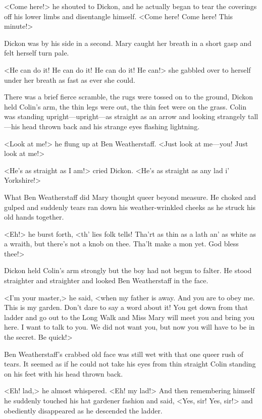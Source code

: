 <Come here!> he shouted to Dickon, and he actually began to tear the coverings off his lower limbs and disentangle himself. <Come here! Come here! This minute!>

Dickon was by his side in a second. Mary caught her breath in a short gasp and felt herself turn pale.

<He can do it! He can do it! He can do it! He can!> she gabbled over to herself under her breath as fast as ever she could.

There was a brief fierce scramble, the rugs were tossed on to the ground, Dickon held Colin's arm, the thin legs were out, the thin feet were on the grass. Colin was standing upright—upright—as straight as an arrow and looking strangely tall—his head thrown back and his strange eyes flashing lightning.

<Look at me!> he flung up at Ben Weatherstaff. <Just look at me—you! Just look at me!>

<He's as straight as I am!> cried Dickon. <He's as straight as any lad i' Yorkshire!>

What Ben Weatherstaff did Mary thought queer beyond measure. He choked and gulped and suddenly tears ran down his weather-wrinkled cheeks as he struck his old hands together.

<Eh!> he burst forth, <th' lies folk tells! Tha'rt as thin as a lath an' as white as a wraith, but there's not a knob on thee. Tha'lt make a mon yet. God bless thee!>

Dickon held Colin's arm strongly but the boy had not begun to falter. He stood straighter and straighter and looked Ben Weatherstaff in the face.

<I'm your master,> he said, <when my father is away. And you are to obey me. This is my garden. Don't dare to say a word about it! You get down from that ladder and go out to the Long Walk and Miss Mary will meet you and bring you here. I want to talk to you. We did not want you, but now you will have to be in the secret. Be quick!>

Ben Weatherstaff's crabbed old face was still wet with that one queer rush of tears. It seemed as if he could not take his eyes from thin straight Colin standing on his feet with his head thrown back.

<Eh! lad,> he almost whispered. <Eh! my lad!> And then remembering himself he suddenly touched his hat gardener fashion and said, <Yes, sir! Yes, sir!> and obediently disappeared as he descended the ladder.

